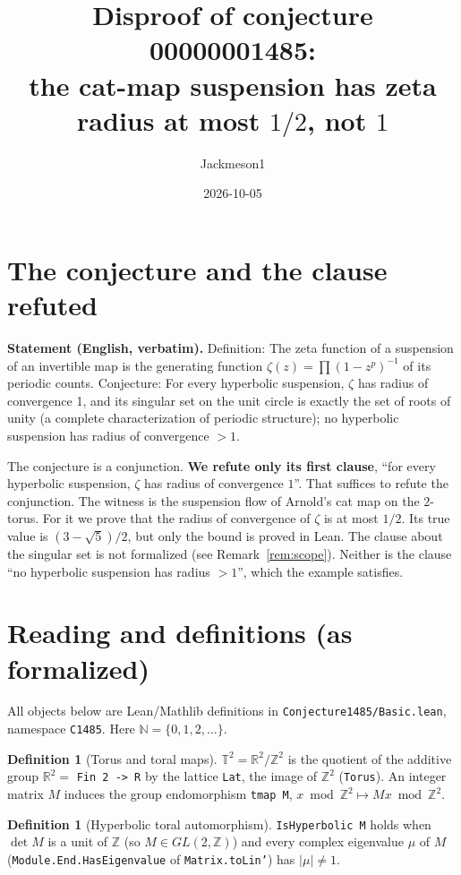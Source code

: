 \documentclass[11pt]{article}
\title{Disproof of conjecture 00000001485:\\ the cat-map suspension has zeta radius at most $1/2$, not $1$}
\author{Jackmeson1}
\date{2026-10-05}
\theoremstyle{definition}
\newtheorem{definition}[theorem]{Definition}
\newcommand{\Z}{\mathbb{Z}}
\newcommand{\R}{\mathbb{R}}
\newcommand{\T}{\mathbb{T}}
\begin{document}
\maketitle

\section{The conjecture and the clause refuted}

\textbf{Statement (English, verbatim).} Definition: The zeta function of a suspension of an invertible
map is the generating function $\zeta(z)=\prod(1-z^p)^{-1}$ of its periodic counts. Conjecture: For
every hyperbolic suspension, $\zeta$ has radius of convergence 1, and its singular set on the unit
circle is exactly the set of roots of unity (a complete characterization of periodic structure); no
hyperbolic suspension has radius of convergence $>1$.

The conjecture is a conjunction. \textbf{We refute only its first clause}, ``for every hyperbolic
suspension, $\zeta$ has radius of convergence $1$''. That suffices to refute the conjunction. The
witness is the suspension flow of Arnold's cat map on the $2$-torus. For it we prove that the
radius of convergence of $\zeta$ is at most $1/2$. Its true value is $(3-\sqrt5)/2$, but only the
bound is proved in Lean. The clause about the singular set is not formalized (see
Remark~\ref{rem:scope}). Neither is the clause ``no hyperbolic suspension has radius $>1$'', which
the example satisfies.

\section{Reading and definitions (as formalized)}

All objects below are Lean/Mathlib definitions in \texttt{Conjecture1485/Basic.lean}, namespace
\texttt{C1485}. Here $\mathbb N=\{0,1,2,\dots\}$.

\begin{definition}[Torus and toral maps]
$\T^2=\R^2/\Z^2$ is the quotient of the additive group $\R^2=$ \texttt{Fin 2 -> R} by the lattice
\texttt{Lat}, the image of $\Z^2$ (\texttt{Torus}). An integer matrix $M$ induces the group
endomorphism \texttt{tmap M}, $x\bmod\Z^2\mapsto Mx\bmod\Z^2$.
\end{definition}

\begin{definition}[Hyperbolic toral automorphism]
\texttt{IsHyperbolic M} holds when $\det M$ is a unit of $\Z$ (so $M\in GL(2,\Z)$) and every complex
eigenvalue $\mu$ of $M$ (\texttt{Module.End.HasEigenvalue} of \texttt{Matrix.toLin'}) has
$|\mu|\neq 1$.
\end{definition}
\end{document}
